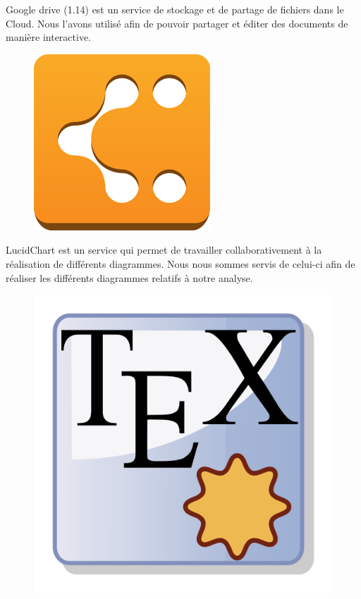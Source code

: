 \documentclass[16pts]{report}
\begin{document}
Google drive (1.14) est un service de stockage et de partage de fichiers dans
le Cloud. Nous l'avons utilisé afin de pouvoir partager et éditer des documents
de manière interactive.\\

\begin{figure}[H]
    \includegraphics[scale=0.15]{illustrations/lucidchart.png}
    \centering
\end{figure}

LucidChart est un service qui permet de travailler collaborativement à la
réalisation de différents diagrammes. Nous nous sommes servis de celui-ci afin
de réaliser les différents diagrammes relatifs à notre analyse.\\

\begin{figure}[H]
    \includegraphics[scale=1.1]{illustrations/texmaker.png}
    \centering
\end{figure}
\end{document}
